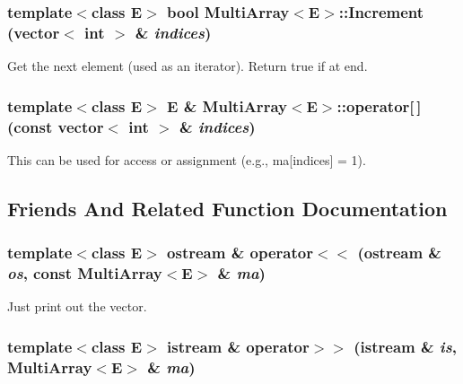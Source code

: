 \subsubsection{\setlength{\rightskip}{0pt plus 5cm}template$<$class E$>$ bool Multi\-Array$<$E$>$::Increment (vector$<$ int $>$ \& {\em indices})\hspace{0.3cm}{\tt  [inline]}}\label{class_MultiArray_a5}


Get the next element (used as an iterator). Return true if at end.

\subsubsection{\setlength{\rightskip}{0pt plus 5cm}template$<$class E$>$ E \& Multi\-Array$<$E$>$::operator[$\,$] (const vector$<$ int $>$ \& {\em indices})\hspace{0.3cm}{\tt  [inline]}}\label{class_MultiArray_a4}


This can be used for access or assignment (e.g., ma[indices] = 1).



\subsection{Friends And Related Function Documentation}
\subsubsection{\setlength{\rightskip}{0pt plus 5cm}template$<$class E$>$ ostream \& operator$<$$<$ (ostream \& {\em os}, const Multi\-Array$<$E$>$ \& {\em ma})\hspace{0.3cm}{\tt  [friend]}}\label{class_MultiArray_l1}


Just print out the vector.

\subsubsection{\setlength{\rightskip}{0pt plus 5cm}template$<$class E$>$ istream \& operator$>$$>$ (istream \& {\em is}, Multi\-Array$<$E$>$ \& {\em ma})\hspace{0.3cm}{\tt  [friend]}}\label{class_MultiArray_l0}


